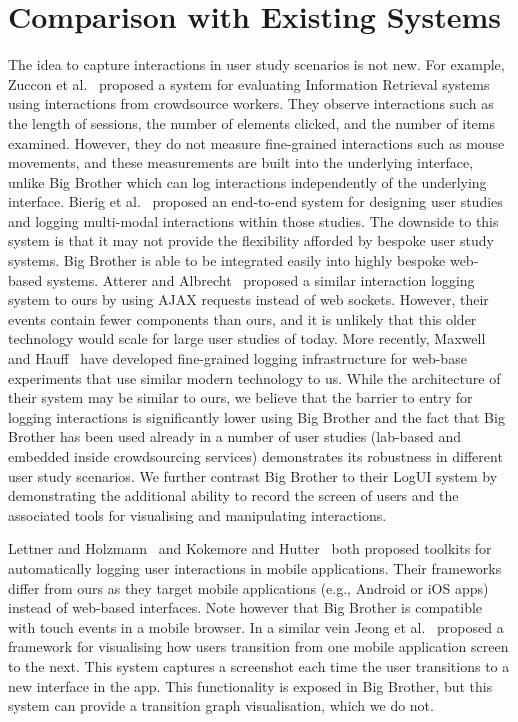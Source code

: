 \section{Comparison with Existing Systems}

The idea to capture interactions in user study scenarios is not new. For example, Zuccon et al.~\cite{zuccon2013crowdsourcing} proposed a system for evaluating Information Retrieval systems using interactions from crowdsource workers. They observe interactions such as the length of sessions, the number of elements clicked, and the number of items examined. However, they do not measure fine-grained interactions such as mouse movements, and these measurements are built into the underlying interface, unlike Big Brother which can log interactions independently of the underlying interface. Bierig et al.~\cite{bierig2009user} proposed an end-to-end system for designing user studies and logging multi-modal interactions within those studies. The downside to this system is that it may not provide the flexibility afforded by bespoke user study systems. Big Brother is able to be integrated easily into highly bespoke web-based systems. Atterer and Albrecht~\cite{atterer2007tracking} proposed a similar interaction logging system to ours by using AJAX requests instead of web sockets. However, their events contain fewer components than ours, and it is unlikely that this older technology would scale for large user studies of today. More recently, Maxwell and Hauff~\cite{maxwell2021logui} have developed fine-grained logging infrastructure for web-base experiments that use similar modern technology to us. While the architecture of their system may be similar to ours, we believe that the barrier to entry for logging interactions is significantly lower using Big Brother and the fact that Big Brother has been used already in a number of user studies (lab-based and embedded inside crowdsourcing services) demonstrates its robustness in different user study scenarios. We further contrast Big Brother to their LogUI system by demonstrating the additional ability to record the screen of users and the associated tools for visualising and manipulating interactions.

Lettner and Holzmann~\cite{lettner2012automated} and Kokemore and Hutter~\cite{kokemor2016aspect} both proposed toolkits for automatically logging user interactions in mobile applications. Their frameworks differ from ours as they target mobile applications (e.g., Android or iOS apps) instead of web-based interfaces. Note however that Big Brother is compatible with touch events in a mobile browser. In a similar vein Jeong et al.~\cite{jeong2020gui} proposed a framework for visualising how users transition from one mobile application screen to the next. This system captures a screenshot each time the user transitions to a new interface in the app. This functionality is exposed in Big Brother, but this system can provide a transition graph visualisation, which we do not. 